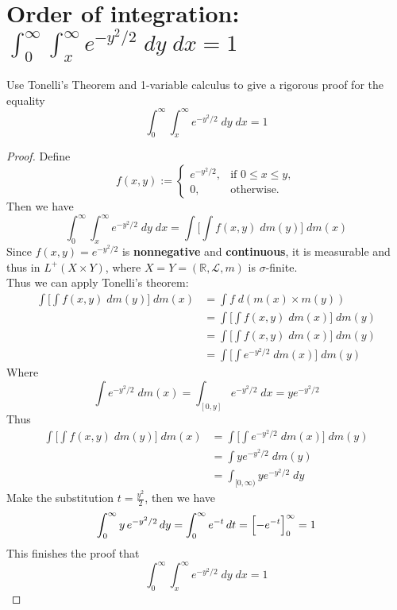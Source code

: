 \documentclass[lang=cn,11pt]{elegantbook}
\begin{document}
\section{Order of integration: $ \int_0^\infty\int_x^\infty e^{-y^2/2}\;d y \;d x=1$}
  Use Tonelli's Theorem and 1-variable calculus to give a rigorous proof for the equality
  \[
    \int_0^\infty\int_x^\infty e^{-y^2/2}\;d y \;d x=1
  \]
\begin{proof}
 Define \[
 f(x,y) := \begin{cases}
   e^{-y^2/2}, & \text{if } 0 \le x \le y,\\
   0, & \text{otherwise}.
   \end{cases}
 \] Then we have \[
     \int_0^\infty\int_x^\infty e^{-y^2/2}\;d y \;d x=   \int \Big[   \int f(x,y) \; d m(y)  \Big]  \; dm(x) 
 \]
 Since $ f (x,y) = e^{-y^2/2}$ is \textbf{nonnegative} and \textbf{continuous}, it is measurable and thus in $L^+(X \times Y)$, where $X = Y = (\mathbb{R},\mathcal{L}, m)$ is $\sigma$-finite.\\
    Thus we can apply Tonelli's theorem: \begin{align}
      \int \Big[   \int f(x,y) \; d m(y)  \Big]  \; dm(x) &= \int f \; d(m(x)  \times m(y))     \\
& =    \int \Big[   \int f(x,y) \; d m(x)  \Big]  \; dm(y) \\
& =  \int \Big[   \int f(x,y) \; d m(x)  \Big]  \; dm(y) \\
& = \int \Big[   \int e^{-y^2/2} \; d m(x)  \Big]  \; dm(y) 
    \end{align}Where\[
     \int e^{-y^2/2} \; d m(x)   = \int_{[0,y]} e^{-y^2/2} \; dx =  ye^{-y^2/2}
    \]
Thus  \begin{align}
      \int \Big[   \int f(x,y) \; d m(y)  \Big]  \; dm(x) &=\int \Big[   \int e^{-y^2/2} \; d m(x)  \Big]  \; dm(y) \\
      &= \int ye^{-y^2/2} \; dm(y) \\
      & = \int_{[0,\infty)} ye^{-y^2/2} \; dy 
\end{align}
Make the substitution \(t = \frac{y^2}{2}\), then we have
\[
\int_0^\infty y\, e^{-y^2/2}\,dy =
\int_0^\infty e^{-t}\,dt =
\Bigl[ - e^{-t} \Bigr]_{0}^{\infty} = 1
\]
This finishes the proof that \[
 \int_0^\infty\int_x^\infty e^{-y^2/2}\;d y \;d x = 1
\]
\end{proof}
\end{document}
